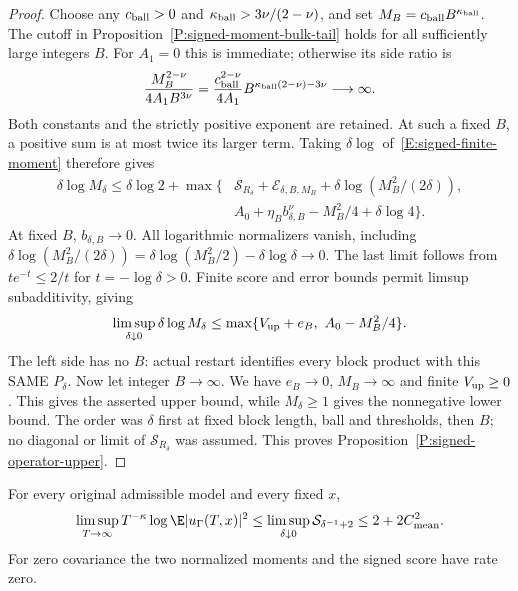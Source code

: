 \begin{proof}
  Choose any $c_{\rm ball}>0$ and
  $\kappa_{\rm ball}>3\nu/(2-\nu)$, and set
  $M_B=c_{\rm ball}B^{\kappa_{\rm ball}}$.
  The cutoff in Proposition~\ref{P:signed-moment-bulk-tail}
  holds for all sufficiently large integers $B$.
  For $A_1=0$ this is immediate; otherwise its side ratio is
  \[
    \frac{M_B^{2-\nu}}{4A_1B^{3\nu}}
    =\frac{c_{\rm ball}^{2-\nu}}{4A_1}
    B^{\kappa_{\rm ball}(2-\nu)-3\nu}\longrightarrow\infty .
  \]
  Both constants and the strictly positive exponent are retained.
  At such a fixed $B$, a positive sum is at most twice its larger term.
  Taking $\delta\log$ of~\eqref{E:signed-finite-moment} therefore gives
  \begin{align*}
    \delta\log M_\delta\le\delta\log2+
    \max\{&
    \mathcal S_{R_\delta}+\mathcal E_{\delta,B,M_B}
    +\delta\log(M_B^2/(2\delta)),\\
    &A_0+\eta_Bb_{\delta,B}^\nu-M_B^2/4+\delta\log4\}.
  \end{align*}
  At fixed $B$, $b_{\delta,B}\to0$.
  All logarithmic normalizers vanish, including
  $\delta\log(M_B^2/(2\delta))
  =\delta\log(M_B^2/2)-\delta\log\delta\to0$.
  The last limit follows from $te^{-t}\le2/t$ for $t=-\log\delta>0$.
  Finite score and error bounds permit limsup subadditivity, giving
  \[
    \limsup_{\delta\downarrow0}\delta\log M_\delta
    \le\max\{V_{\rm up}+e_B,\ A_0-M_B^2/4\}.
  \]
  The left side has no $B$: actual restart identifies every block
  product with this SAME $P_\delta$.
  Now let integer $B\to\infty$. We have $e_B\to0$, $M_B\to\infty$
  and finite $V_{\rm up}\ge0$.
  This gives the asserted upper bound, while $M_\delta\ge1$
  gives the nonnegative lower bound.
  The order was $\delta$ first at fixed block length, ball and thresholds,
  then $B$; no diagonal or limit of $\mathcal S_{R_\delta}$ was assumed.
  This proves Proposition~\ref{P:signed-operator-upper}.
\end{proof}

\begin{proposition}
  \label{P:original-signed-point-upper}
  For every original admissible model and every fixed $x$,
  \[
    \limsup_{T\to\infty}T^{-\kappa}
    \log\E|u_\Gamma(T,x)|^2
    \le\limsup_{\delta\downarrow0}\mathcal S_{\delta^{-1}+2}
    \le2+2C_{\rm mean}^2 .
  \]
  For zero covariance the two normalized moments and the signed score
  have rate zero.
\end{proposition}

